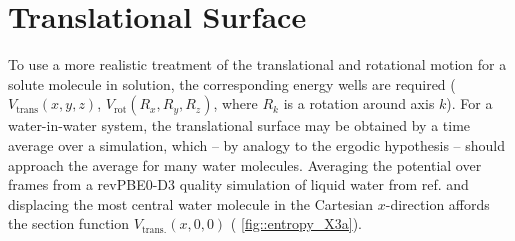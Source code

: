 \documentclass[../main.tex]{subfiles}
\begin{document}
\section{Translational Surface}
To use a more realistic treatment of the translational and rotational motion for a solute molecule in solution, the corresponding energy wells are required ($V_\text{trans}(x, y, z)$, $V_\text{rot}(R_x, R_y, R_z)$, where $R_k$ is a rotation around axis $k$). For a water-in-water system, the translational surface may be obtained by a time average over a simulation, which -- by analogy to the ergodic hypothesis -- should approach the average for many water molecules. Averaging the potential over frames from a revPBE0-D3 quality simulation of liquid water from ref. \cite{Young2021GAP} and displacing the most central water molecule in the Cartesian $x$-direction affords the section function $V_\text{trans.}(x, 0, 0)$ (\figurename{ \ref{fig::entropy_X3a}}). 
\end{document}
